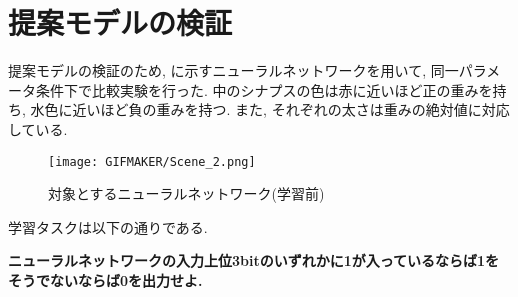 \section{提案モデルの検証}
提案モデルの検証のため, に示すニューラルネットワークを用いて, 
同一パラメータ条件下で比較実験を行った.
中のシナプスの色は赤に近いほど正の重みを持ち, 
水色に近いほど負の重みを持つ.
また, それぞれの太さは重みの絶対値に対応している.
\begin{figure}[H]
  \centering
  \texttt{[image: GIFMAKER/Scene\_2.png]}
  \caption{対象とするニューラルネットワーク(学習前)}
  \label{fig:Before}
\end{figure}
学習タスクは以下の通りである.
\begin{center}
  \textbf{ニューラルネットワークの入力上位3bitのいずれかに1が入っているならば1をそうでないならば0を出力せよ.}  
\end{center} 

